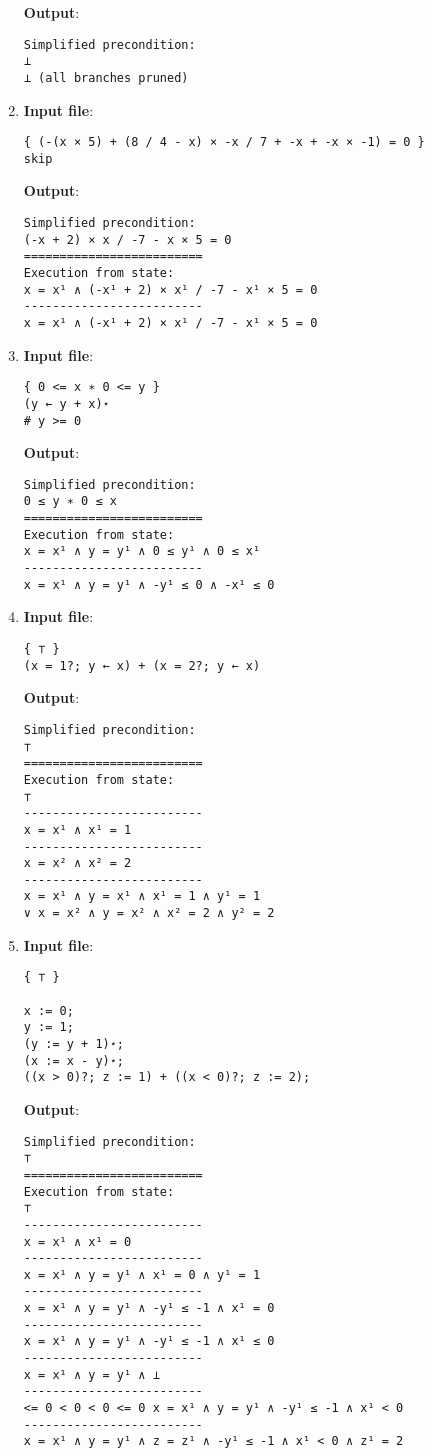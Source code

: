 \documentclass[parskip=half]{scrartcl}
\begin{document}
\begin{enumerate}
\textbf{Output}: 
\begin{verbatim}
Simplified precondition:
⊥
⊥ (all branches pruned)
\end{verbatim}

\item 
\textbf{Input file}: 
\begin{verbatim}
{ (-(x × 5) + (8 / 4 - x) × -x / 7 + -x + -x × -1) = 0 }
skip
\end{verbatim}

\textbf{Output}: 
\begin{verbatim}
Simplified precondition:
(-x + 2) × x / -7 - x × 5 = 0
=========================
Execution from state:
x = x¹ ∧ (-x¹ + 2) × x¹ / -7 - x¹ × 5 = 0
-------------------------
x = x¹ ∧ (-x¹ + 2) × x¹ / -7 - x¹ × 5 = 0
\end{verbatim}

\item 
\textbf{Input file}: 
\begin{verbatim}
{ 0 <= x ∗ 0 <= y }
(y ← y + x)⋆
# y >= 0
\end{verbatim}

\textbf{Output}: 
\begin{verbatim}
Simplified precondition:
0 ≤ y ∗ 0 ≤ x
=========================
Execution from state:
x = x¹ ∧ y = y¹ ∧ 0 ≤ y¹ ∧ 0 ≤ x¹
-------------------------
x = x¹ ∧ y = y¹ ∧ -y¹ ≤ 0 ∧ -x¹ ≤ 0
\end{verbatim}

\item \textbf{Input file}: 
\begin{verbatim}
{ ⊤ }
(x = 1?; y ← x) + (x = 2?; y ← x)
\end{verbatim}

\textbf{Output}: 
\begin{verbatim}
Simplified precondition:
⊤
=========================
Execution from state:
⊤
-------------------------
x = x¹ ∧ x¹ = 1
-------------------------
x = x² ∧ x² = 2
-------------------------
x = x¹ ∧ y = x¹ ∧ x¹ = 1 ∧ y¹ = 1
∨ x = x² ∧ y = x² ∧ x² = 2 ∧ y² = 2
\end{verbatim}

\item 
\textbf{Input file}: 
\begin{verbatim}
{ ⊤ }

x := 0;
y := 1;
(y := y + 1)⋆;
(x := x - y)⋆;
((x > 0)?; z := 1) + ((x < 0)?; z := 2);
\end{verbatim}

\textbf{Output}: 
\begin{verbatim}
Simplified precondition:
⊤
=========================
Execution from state:
⊤
-------------------------
x = x¹ ∧ x¹ = 0
-------------------------
x = x¹ ∧ y = y¹ ∧ x¹ = 0 ∧ y¹ = 1
-------------------------
x = x¹ ∧ y = y¹ ∧ -y¹ ≤ -1 ∧ x¹ = 0
-------------------------
x = x¹ ∧ y = y¹ ∧ -y¹ ≤ -1 ∧ x¹ ≤ 0
-------------------------
x = x¹ ∧ y = y¹ ∧ ⊥
-------------------------
<= 0 < 0 < 0 <= 0 x = x¹ ∧ y = y¹ ∧ -y¹ ≤ -1 ∧ x¹ < 0
-------------------------
x = x¹ ∧ y = y¹ ∧ z = z¹ ∧ -y¹ ≤ -1 ∧ x¹ < 0 ∧ z¹ = 2
\end{verbatim}

\end{enumerate}
\end{document}
